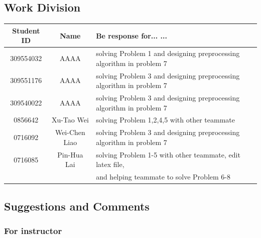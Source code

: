 \documentclass[a4 paper]{article}
\begin{document}
\subsection{Work Division}
\begin{center}
    \begin{tabular}{||c|c|l||}
    \hline
    Student ID & Name & Be response for... ... \\\hline
    309554032 & AAAA & solving Problem 1 and designing preprocessing algorithm in problem 7\\\hline
    309551176 & AAAA & solving Problem 3 and designing preprocessing algorithm in problem 7\\\hline
    309540022 & AAAA & solving Problem 3 and designing preprocessing algorithm in problem 7\\\hline
    0856642 & Xu-Tao Wei &  solving Problem 1,2,4,5 with other teammate\\\hline
    0716092 & Wei-Chen Liao & solving Problem 3 and designing preprocessing algorithm in problem 7\\\hline
    0716085 & Pin-Hua Lai & solving Problem 1-5 with other teammate, edit latex file, \\\hline
     &  & \hspace*{0.5cm}and helping teammate to solve Problem 6-8\\\hline
\end{tabular}
\end{center}
\subsection{Suggestions and Comments}
\subsubsection{For instructor}
\end{document}
